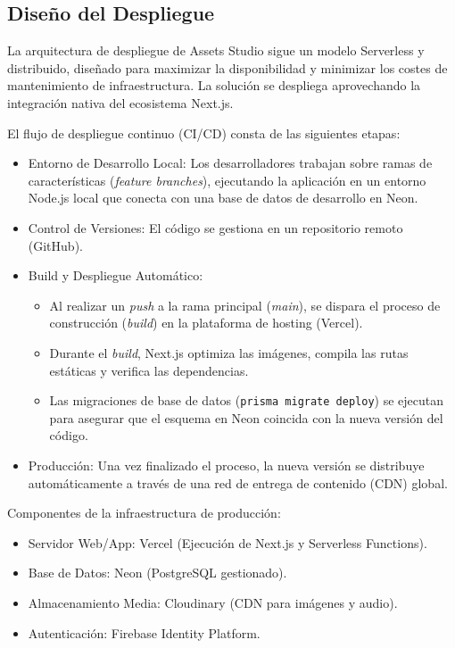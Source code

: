\subsection{Diseño del Despliegue}

La arquitectura de despliegue de Assets Studio sigue un modelo Serverless y distribuido, diseñado para maximizar la disponibilidad y minimizar los costes de mantenimiento de infraestructura. La solución se despliega aprovechando la integración nativa del ecosistema Next.js.

El flujo de despliegue continuo (CI/CD) consta de las siguientes etapas:

\begin{itemize}
    \item Entorno de Desarrollo Local: Los desarrolladores trabajan sobre ramas de características (\textit{feature branches}), ejecutando la aplicación en un entorno Node.js local que conecta con una base de datos de desarrollo en Neon.
    \item Control de Versiones: El código se gestiona en un repositorio remoto (GitHub).
    \item Build y Despliegue Automático:
        \begin{itemize}
            \item Al realizar un \textit{push} a la rama principal (\textit{main}), se dispara el proceso de construcción (\textit{build}) en la plataforma de hosting (Vercel).
            \item Durante el \textit{build}, Next.js optimiza las imágenes, compila las rutas estáticas y verifica las dependencias.
            \item Las migraciones de base de datos (\texttt{prisma migrate deploy}) se ejecutan para asegurar que el esquema en Neon coincida con la nueva versión del código.
        \end{itemize}
    \item Producción: Una vez finalizado el proceso, la nueva versión se distribuye automáticamente a través de una red de entrega de contenido (CDN) global.
\end{itemize}

Componentes de la infraestructura de producción:
\begin{itemize}
    \item Servidor Web/App: Vercel (Ejecución de Next.js y Serverless Functions).
    \item Base de Datos: Neon (PostgreSQL gestionado).
    \item Almacenamiento Media: Cloudinary (CDN para imágenes y audio).
    \item Autenticación: Firebase Identity Platform.
\end{itemize}

